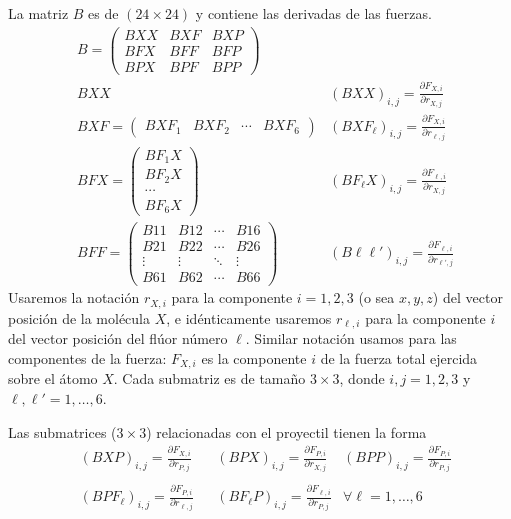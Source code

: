 La matriz $B$ es de $(24\times 24)$ y contiene las derivadas de las fuerzas.
%
\begin{subequations}
  \begin{align}
    \label{Q:Jacob-eq-dif-B}
&   B =
\begin{pmatrix}
  BXX & BXF & BXP \\
  BFX & BFF & BFP \\
  BPX & BPF & BPP 
\end{pmatrix}   \\ \label{Q:Jacob-eq-dif-BXX}
    & BXX  & (BXX)_{i,j} = \frac{\partial F_{X,i}}{\partial r_{X,j}}  \\
\label{Q:Jacob-eq-dif-BXF}    &BXF =  \begin{pmatrix}   BXF_{1} & BXF_{2} & \cdots & BXF_{6}   \end{pmatrix}
    & (BXF_{\ell})_{i,j}=  \frac{\partial F_{X,i}}{\partial r_{\ell,j}}\\
\label{Q:Jacob-eq-dif-BFX}    &BFX =  \begin{pmatrix}   BF_{1}X \\ BF_{2}X \\ \cdots \\ BF_{6}X   \end{pmatrix}
    & (BF_{\ell}X)_{i,j}=  \frac{\partial F_{\ell,i}}{\partial r_{X,j}} \\ 
\label{Q:Jacob-eq-dif-BFF}    &BFF =  \begin{pmatrix}
  B11 & B12 & \cdots & B16 \\
  B21 & B22 & \cdots & B26 \\
  \vdots  & \vdots  & \ddots & \vdots  \\
  B61 & B62 & \cdots & B66 
 \end{pmatrix} & (B\ell\ell')_{i,j}=  \frac{\partial F_{\ell,i}}{\partial r_{\ell',j}}
  \end{align}
\end{subequations}
Usaremos la notaci\'{o}n $r_{X,i}$ para la componente $i=1,2,3$ (o sea $x,y,z$) del vector posici\'{o}n de la mol\'{e}cula $X$, e id\'{e}nticamente usaremos $r_{\ell, i}$ para la componente $i$ del vector posici\'{o}n del fl\'{u}or n\'{u}mero $\ell$. Similar notaci\'{o}n usamos para las componentes de la fuerza: $F_{X,i}$ es la componente $i$ de la fuerza total ejercida sobre el \'{a}tomo $X$.
Cada submatriz es de tama\~{n}o $3 \times 3$, donde $i,j= 1,2,3$  y $\ell,\ell'=1, \dots, 6$.

Las submatrices ($3 \times 3$) relacionadas con el proyectil tienen la forma 
\begin{align}
 & (BXP)_{i,j} =  \frac{\partial F_{X,i}}{\partial r_{P,j}} &
 & (BPX)_{i,j} =  \frac{\partial F_{P,i}}{\partial r_{X,j}} &  (BPP)_{i,j}=\frac{\partial F_{P,i}}{\partial r_{P,j}} \nonumber \\
\\
 & (BPF_{\ell})_{i,j}=  \frac{\partial F_{P,i}}{\partial r_{\ell,j}} &
 & (BF_{\ell}P)_{i,j}=  \frac{\partial F_{\ell,i}}{\partial r_{P,j}} & \forall \ell= 1, \dots, 6 \nonumber
\end{align}





